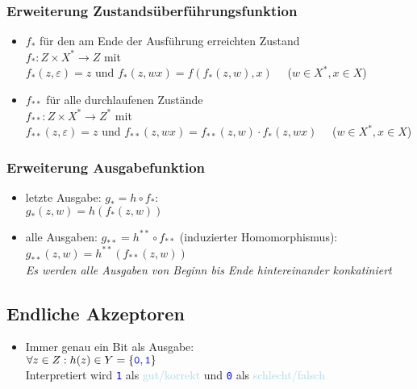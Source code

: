 \documentclass{article}
\newcommand{\blue}[1]{\textcolor{blue}{#1}}
\newcommand{\babyblue}[1]{\textcolor{lightblue}{#1}}
\newcommand{\important}[1]{\textcolor{importantColor}{#1}}
\newcommand{\word}[1]{\blue{\texttt{#1}}}
\newcommand{\interpretation}[1]{\babyblue{#1}}
\newcommand{\set}[1]{\{#1\}}
\newcommand{\anfuehrung}[1]{\flqq #1\frqq}
\begin{document}
\subsubsection{Erweiterung Zustandsüberführungsfunktion}
\begin{itemize}
    \item $f_*$ für den am Ende der Ausführung erreichten Zustand\\
    $f_*:Z\times X^*\to Z$ mit\\
    $f_*(z, \varepsilon) = z$ und $f_*(z, wx)=f(f_*(z,w),x)\quad$ ($w\in X^*, x\in X$)
    \item $f_{**}$ für alle durchlaufenen Zustände\\
    $f_{**}:Z\times X^*\to Z^*$ mit\\
    $f_{**}(z,\varepsilon)=z$ und $f_{**}(z,wx)=f_{**}(z,w)\cdot f_*(z,wx)\quad$ ($w\in X^*, x\in X$)
\end{itemize}

\subsubsection{Erweiterung Ausgabefunktion}
\begin{itemize}
    \item \anfuehrung{letzte Ausgabe}: \important{$g_*=h\circ f_*$}:\\
    $g_*(z,w)=h(f_*(z,w))$
    \item \anfuehrung{alle Ausgaben}: \important{$g_{**}=h^{**}\circ f_{**}$} (induzierter Homomorphismus):\\
    $g_{**}(z,w)=h^{**}(f_{**}(z,w))$\\
    \textit{Es werden alle Ausgaben von Beginn bis Ende hintereinander konkatiniert}
\end{itemize}

\subsection{Endliche Akzeptoren}
\begin{itemize}
    \item Immer genau ein Bit als Ausgabe:\\
    $\forall z \in Z: h(z)\in Y=\set{\word{0}, \word{1}}$
    \\Interpretiert wird \word{1} als \interpretation{gut/korrekt} und \word{0} als \interpretation{schlecht/falsch}
\end{itemize}
\end{document}
